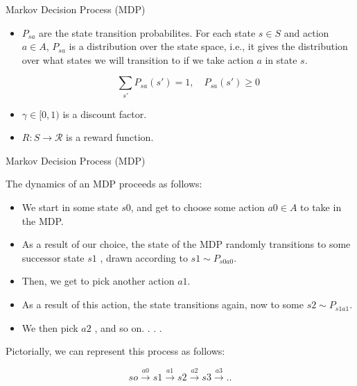 \documentclass[handout]{beamer}
\begin{document}
\begin{frame}{Markov Decision Process (MDP)}
\scriptsize{
\begin{itemize}
\item $P_{sa}$ are the state transition probabilites. For each state $s \in S$ and
action $a \in A$, $P_{sa}$ is a distribution over the state space, i.e., it gives the distribution over what states we will transition to if we take action $a$ in state $s$.

\begin{displaymath}
 \sum_{s'}P_{sa}(s')=1, \quad P_{sa}(s')\geq 0
\end{displaymath}

\item $\gamma \in [0,1)$ is a discount factor.

\item $R: S \rightarrow \mathcal{R}$  is a reward function.

\end{itemize}


} 

\end{frame}




\begin{frame}{Markov Decision Process (MDP)}
\scriptsize{
The dynamics of an MDP proceeds as follows:
\begin{itemize}
\item  We start in some state $s0$, and get to choose some action $a0 \in A$ to take in the MDP.
\item As a result of our choice, the state of the MDP randomly transitions to some successor state $s1$ , drawn according to $s1 \sim P_{s0a0}$.
\item Then, we get to pick another action $a1$.
\item As a result of this action, the state transitions again, now to some $s2 \sim P_{s1a1}$.
\item We then pick $a2$ , and so on. . . . 
\end{itemize}

Pictorially, we can represent this process as follows:


\begin{displaymath}
 so \xrightarrow{a0} s1 \xrightarrow{a1} s2 \xrightarrow{a2}  s3 \xrightarrow{a3} ..
\end{displaymath}



} 

\end{frame}
\end{document}
